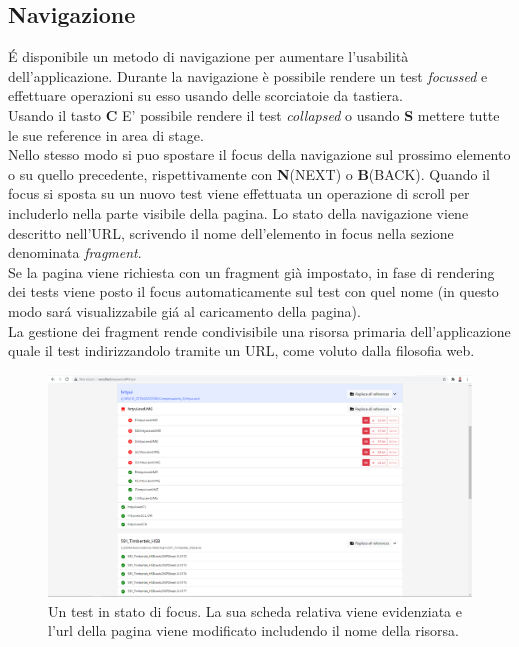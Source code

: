             \subsection{Navigazione}
                \'E disponibile un metodo di navigazione per aumentare l'usabilità dell'applicazione.
                Durante la navigazione è possibile rendere un test \textit{focussed} e effettuare operazioni su esso usando delle scorciatoie da tastiera.\\
                Usando il tasto \textbf{C} E' possibile rendere il test \textit{collapsed} o usando \textbf{S} mettere tutte le sue reference in area di stage.\\ 
                Nello stesso modo si puo spostare il focus della navigazione sul prossimo elemento o su quello precedente, rispettivamente con \textbf{N}(NEXT) o \textbf{B}(BACK).
                Quando il focus si sposta su un nuovo test viene effettuata un operazione di scroll per includerlo nella parte visibile della pagina.
                Lo stato della navigazione viene descritto nell'URL, scrivendo il nome dell'elemento in focus nella sezione denominata \textit{fragment}.\\
                Se la pagina viene richiesta con un fragment già impostato, in fase di rendering dei tests viene posto il focus automaticamente sul test con quel nome (in questo modo sar\'a visualizzabile gi\'a al caricamento della pagina).\\
                La gestione dei fragment rende condivisibile una risorsa primaria dell'applicazione quale il test indirizzandolo tramite un URL, come voluto dalla filosofia web. 
            
            \begin{figure}
                \includegraphics[width=\textwidth]{images/active.png}
                \caption{Un test in stato di focus. La sua scheda relativa viene evidenziata e l'url della pagina viene modificato includendo il nome della risorsa.}
            \end{figure}
